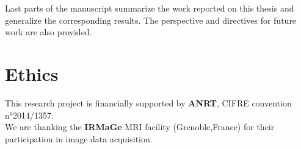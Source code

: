 Last parts of the manuscript summarize the work reported on this thesis and generalize the corresponding results. The perspective and directives for future work are also provided.  

\cleardoublepage  

\chapter*{Ethics}\label{section:ethics}

This research project is financially supported by \textbf{ANRT}, CIFRE convention n°2014/1357.
\\

\noindent We are thanking the \textbf{IRMaGe} MRI facility (Grenoble,France) for their participation in image data acquisition. 

\cleardoublepage
